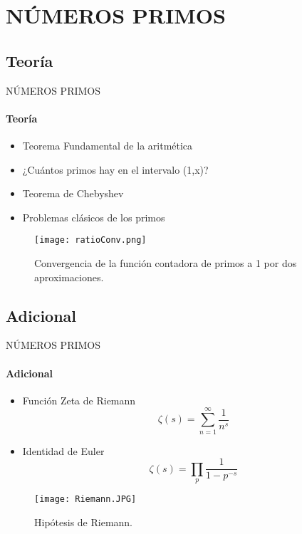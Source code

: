 \section{NÚMEROS PRIMOS}
\subsection{Teoría}
\begin{frame}{NÚMEROS PRIMOS}
	\framesubtitle{Teoría}
	\begin{itemize}
      \item Teorema Fundamental de la aritmética
      \item ¿Cuántos primos hay en el intervalo (1,x)?
      \item Teorema de Chebyshev
      \item Problemas clásicos de los primos
	\end{itemize}
    \begin{figure}
    	\centering
        \texttt{[image: ratioConv.png]}
        \caption{Convergencia de la función contadora de primos a 1 por dos aproximaciones\footnotemark{}.}
    \end{figure}
    \vspace{-1cm}
\end{frame}
\subsection{Adicional}
\begin{frame}{NÚMEROS PRIMOS}
	\framesubtitle{Adicional}
    \begin{itemize}
    \item Función Zeta de Riemann
    	\begin{equation}
    		\zeta (s)=\sum_{n=1}^{\infty}{\frac{1}{n^s}}
    	\end{equation}
    \item Identidad de Euler
    	\begin{equation}
    		\zeta(s)=\prod_{p}{\frac{1}{1-p^{-s}}}
    	\end{equation}
    \end{itemize}
    \begin{figure}
    	\centering
        \texttt{[image: Riemann.JPG]}
        \caption{Hipótesis de Riemann\footnotemark{}.}
    \end{figure}
    \vspace{-7mm}
\end{frame}
